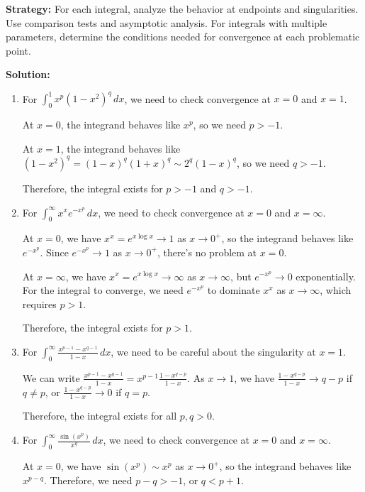\noindent\textbf{Strategy:} For each integral, analyze the behavior at endpoints and singularities. Use comparison tests and asymptotic analysis. For integrals with multiple parameters, determine the conditions needed for convergence at each problematic point.

\bigskip\noindent\textbf{Solution:}
\begin{enumerate}[label=(\alph*)]
\item For $\int_{0}^{1} x^p (1 - x^2)^q \, dx$, we need to check convergence at $x = 0$ and $x = 1$.

At $x = 0$, the integrand behaves like $x^p$, so we need $p > -1$.

At $x = 1$, the integrand behaves like $(1 - x^2)^q = (1 - x)^q (1 + x)^q \sim 2^q (1 - x)^q$, so we need $q > -1$.

Therefore, the integral exists for $p > -1$ and $q > -1$.

\item For $\int_{0}^{\infty} x^x e^{-x^p} \, dx$, we need to check convergence at $x = 0$ and $x = \infty$.

At $x = 0$, we have $x^x = e^{x \log x} \to 1$ as $x \to 0^+$, so the integrand behaves like $e^{-x^p}$. Since $e^{-x^p} \to 1$ as $x \to 0^+$, there's no problem at $x = 0$.

At $x = \infty$, we have $x^x = e^{x \log x} \to \infty$ as $x \to \infty$, but $e^{-x^p} \to 0$ exponentially. For the integral to converge, we need $e^{-x^p}$ to dominate $x^x$ as $x \to \infty$, which requires $p > 1$.

Therefore, the integral exists for $p > 1$.

\item For $\int_{0}^{\infty} \frac{x^{p-1} - x^{q-1}}{1 - x} \, dx$, we need to be careful about the singularity at $x = 1$.

We can write $\frac{x^{p-1} - x^{q-1}}{1 - x} = x^{p-1} \frac{1 - x^{q-p}}{1 - x}$. As $x \to 1$, we have $\frac{1 - x^{q-p}}{1 - x} \to q - p$ if $q \neq p$, or $\frac{1 - x^{q-p}}{1 - x} \to 0$ if $q = p$.

Therefore, the integral exists for all $p, q > 0$.

\item For $\int_{0}^{\infty} \frac{\sin(x^p)}{x^q} \, dx$, we need to check convergence at $x = 0$ and $x = \infty$.

At $x = 0$, we have $\sin(x^p) \sim x^p$ as $x \to 0^+$, so the integrand behaves like $x^{p-q}$. Therefore, we need $p - q > -1$, or $q < p + 1$.


\end{enumerate}
